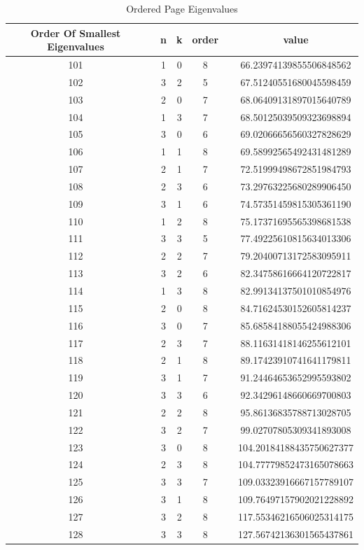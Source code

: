 \documentclass{article}
\begin{document}
\begin{table}[htbp]
\caption{Ordered Page Eigenvalues}
\label{ }
\begin{tabular}{c|c|c|c|c|c|c}
\toprule
Order Of Smallest Eigenvalues &   & n & k & order &   & value \\
\midrule
101 &   & 1 & 0 & 8 &   & 66.23974139855506848562 \\
102 &   & 3 & 2 & 5 &   & 67.51240551680045598459 \\
103 &   & 2 & 0 & 7 &   & 68.06409131897015640789 \\
104 &   & 1 & 3 & 7 &   & 68.50125039509323698894 \\
105 &   & 3 & 0 & 6 &   & 69.02066656560327828629 \\
106 &   & 1 & 1 & 8 &   & 69.58992565492431481289 \\
107 &   & 2 & 1 & 7 &   & 72.51999498672851984793 \\
108 &   & 2 & 3 & 6 &   & 73.29763225680289906450 \\
109 &   & 3 & 1 & 6 &   & 74.57351459815305361190 \\
110 &   & 1 & 2 & 8 &   & 75.17371695565398681538 \\
111 &   & 3 & 3 & 5 &   & 77.49225610815634013306 \\
112 &   & 2 & 2 & 7 &   & 79.20400713172583095911 \\
113 &   & 3 & 2 & 6 &   & 82.34758616664120722817 \\
114 &   & 1 & 3 & 8 &   & 82.99134137501010854976 \\
115 &   & 2 & 0 & 8 &   & 84.71624530152605814237 \\
116 &   & 3 & 0 & 7 &   & 85.68584188055424988306 \\
117 &   & 2 & 3 & 7 &   & 88.11631418146255612101 \\
118 &   & 2 & 1 & 8 &   & 89.17423910741641179811 \\
119 &   & 3 & 1 & 7 &   & 91.24464653652995593802 \\
120 &   & 3 & 3 & 6 &   & 92.34296148660669700803 \\
121 &   & 2 & 2 & 8 &   & 95.86136835788713028705 \\
122 &   & 3 & 2 & 7 &   & 99.02707805309341893008 \\
123 &   & 3 & 0 & 8 &   & 104.20184188435750627377 \\
124 &   & 2 & 3 & 8 &   & 104.77779852473165078663 \\
125 &   & 3 & 3 & 7 &   & 109.03323916667157789107 \\
126 &   & 3 & 1 & 8 &   & 109.76497157902021228892 \\
127 &   & 3 & 2 & 8 &   & 117.55346216506025314175 \\
128 &   & 3 & 3 & 8 &   & 127.56742136301565437861 \\
\bottomrule
\end{tabular}
\end{table}
\end{document}
